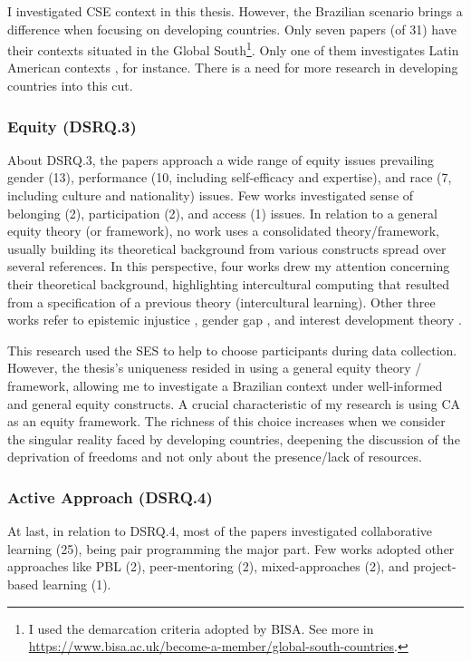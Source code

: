 I investigated \gls{CSE} context in this thesis. However, the Brazilian scenario brings a difference when focusing on developing countries. Only seven papers (of 31) have their contexts situated in the Global South\footnote{I used the demarcation criteria adopted by \gls{BISA}. See more in \url{https://www.bisa.ac.uk/become-a-member/global-south-countries}.}. Only one of them investigates Latin American contexts \cite{roque-hernandez:2021}, for instance. There is a need for more research in developing countries into this cut.

\subsubsection{Equity (DSRQ.3)}

About \gls{DSRQ}.3, the papers approach a wide range of equity issues prevailing gender (13), performance (10, including self-efficacy and expertise), and race (7, including culture and nationality) issues. Few works investigated sense of belonging (2), participation (2), and access (1) issues. In relation to a general equity theory (or framework), no work uses a consolidated theory/framework, usually building its theoretical background from various constructs spread over several references. In this perspective, four works drew my attention concerning their theoretical background, highlighting  intercultural computing \cite{arawjo:2021} that resulted from a specification of a previous theory (intercultural learning). Other three works refer to epistemic injustice \cite{love:2021}, gender gap \cite{bodaker:2023}, and interest development theory \cite{michaelis:2022}.

This research used the \gls{SES} to help to choose participants during data collection. However, the thesis's uniqueness resided in using a general equity theory / framework, allowing me to investigate a Brazilian context under well-informed and general equity constructs. A crucial characteristic of my research is using \gls{CA} as an equity framework. The richness of this choice increases when we consider the singular reality faced by developing countries, deepening the discussion of the deprivation of freedoms and not only about the presence/lack of resources. 

\subsubsection{Active Approach (DSRQ.4)}

At last, in relation to \gls{DSRQ}.4, most of the papers investigated collaborative learning (25), being pair programming the major part. Few works adopted other approaches like \gls{PBL} (2), peer-mentoring (2), mixed-approaches (2), and project-based learning (1).

